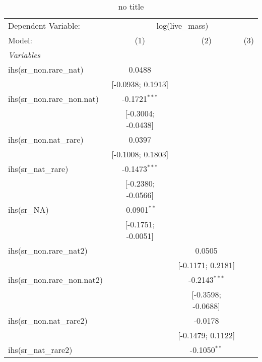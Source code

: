 
\begin{table}[htbp]
   \caption{no title}
   \centering
   \begin{tabular}{lccc}
      \tabularnewline \midrule \midrule
      Dependent Variable: & \multicolumn{3}{c}{log(live\_mass)}\\
      Model:                        & (1)                & (2)                & (3)\\  
      \midrule
      \emph{Variables}\\
      ihs(sr\_non.rare\_nat)        & 0.0488             &                    &   \\   
                                    & [-0.0938; 0.1913]  &                    &   \\   
      ihs(sr\_non.rare\_non.nat)    & -0.1721$^{***}$    &                    &   \\   
                                    & [-0.3004; -0.0438] &                    &   \\   
      ihs(sr\_non.nat\_rare)        & 0.0397             &                    &   \\   
                                    & [-0.1008; 0.1803]  &                    &   \\   
      ihs(sr\_nat\_rare)            & -0.1473$^{***}$    &                    &   \\   
                                    & [-0.2380; -0.0566] &                    &   \\   
      ihs(sr\_NA)                   & -0.0901$^{**}$     &                    &   \\   
                                    & [-0.1751; -0.0051] &                    &   \\   
      ihs(sr\_non.rare\_nat2)       &                    & 0.0505             &   \\   
                                    &                    & [-0.1171; 0.2181]  &   \\   
      ihs(sr\_non.rare\_non.nat2)   &                    & -0.2143$^{***}$    &   \\   
                                    &                    & [-0.3598; -0.0688] &   \\   
      ihs(sr\_non.nat\_rare2)       &                    & -0.0178            &   \\   
                                    &                    & [-0.1479; 0.1122]  &   \\   
      ihs(sr\_nat\_rare2)           &                    & -0.1050$^{**}$     &   \\   

\end{tabular}
\end{table}
